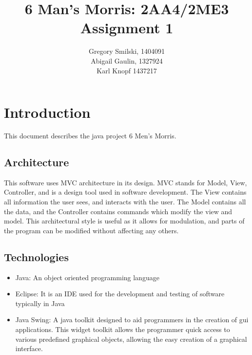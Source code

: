 \documentclass[12pt]{article}
\begin{document}
	\title{6 Man's Morris: 2AA4/2ME3 Assignment 1} %
	\author{
		Gregory Smilski, 1404091\\
		Abigail Gaulin, 1327924\\
		Karl Knopf 1437217} 
	
	\maketitle
	\thispagestyle{empty}
	\newpage
	
	\section{Introduction}
	This document describes the java project 6 Men's Morris. 
	\subsection{Architecture}
	\begin{figure}[!h]
		\centering
	\end{figure}
	This software uses MVC architecture in its design. MVC stands for Model, View, Controller, and is a design tool used in software development. The View contains all information the user sees, and interacts with the user. The Model contains all the data, and the Controller contains commands which modify the view and model. This architectural style is useful as it allows for modulation, and parts of the program can be modified without affecting any others.
	\subsection{Technologies}
	\begin{itemize}
		\item Java:  An object oriented programming language 
		\item Eclipse: It is an IDE used for the development and testing of software typically in Java
		\item Java Swing: A java toolkit designed to aid programmers in the creation of gui applications. This widget toolkit allows the programmer quick access to various predefined graphical objects, allowing the easy creation of a graphical interface.
		
	\end{itemize}
\end{document}
